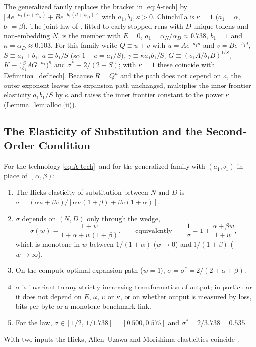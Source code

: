 \begin{definition}\label{def:kappa}
The generalized family replaces the bracket in \eqref{eq:A-tech} by
$\big[Ae^{-a_1(n+\psi_N)}+Be^{-b_1(d+\psi_D)}\big]^{\kappa}$ with $a_1,b_1,\kappa>0$. Chinchilla is $\kappa=1$
($a_1=\alpha$, $b_1=\beta$). The joint law of \citet[eq.~1.5]{kaplan2020scaling}, fitted to early-stopped runs with $D$ unique tokens and
non-embedding $N$, is the member with $E=0$, $a_1=\alpha_N/\alpha_D\approx0.738$, $b_1=1$ and $\kappa=\alpha_D\approx0.103$. For this family write $Q\equiv u+v$
with $u=Ae^{-a_1n}$ and $v=Be^{-b_1d}$, $S\equiv a_1+b_1$, $a\equiv b_1/S$ (so $1-a=a_1/S$), $\gamma\equiv\kappa a_1b_1/S$,
$G\equiv(a_1A/b_1B)^{1/S}$, $K\equiv\big(\tfrac{S}{b_1}AG^{-a_1}\big)^{\kappa}$ and $\sigma^*\equiv2/(2+S)$; with $\kappa=1$
these coincide with Definition~\ref{def:tech}. Because $R=Q^\kappa$ and the path does not depend on $\kappa$, the outer exponent leaves the expansion path
unchanged, multiplies the inner frontier elasticity $a_1b_1/S$ by $\kappa$ and raises the inner frontier constant to
the power $\kappa$ (Lemma~\ref{lem:alloc}(ii)).
\end{definition}

\subsection{The Elasticity of Substitution and the Second-Order Condition}\label{app:sigma}

\begin{lemma}\label{lem:sigma}
For the technology \eqref{eq:A-tech}, and for the generalized family with $(a_1,b_1)$ in place of $(\alpha,\beta)$:
\begin{enumerate}
\item[(i)] The Hicks elasticity of substitution between $N$ and $D$ is
$\sigma=(\alpha u+\beta v)/[\alpha u(1+\beta)+\beta v(1+\alpha)]$.
\item[(ii)] $\sigma$ depends on $(N,D)$ only through the wedge,
\[
\sigma(w)=\frac{1+w}{1+\alpha+w(1+\beta)},\qquad\text{equivalently}\qquad\frac1\sigma=1+\frac{\alpha+\beta w}{1+w},
\]
which is monotone in $w$ between $1/(1+\alpha)$ ($w\to0$) and $1/(1+\beta)$ ($w\to\infty$).
\item[(iii)] On the compute-optimal expansion path ($w=1$), $\sigma=\sigma^*=2/(2+\alpha+\beta)$.
\item[(iv)] $\sigma$ is invariant to any strictly increasing transformation of output; in particular it does not depend
on $E$, $\omega$, $\upsilon$ or $\kappa$, or on whether output is measured by loss, bits per byte or a monotone
benchmark link.
\item[(v)] For the \citet{kaplan2020scaling} law, $\sigma\in[1/2,\,1/1.738]=[0.500,0.575]$ and $\sigma^*=2/3.738=0.535$.
\end{enumerate}
With two inputs the Hicks, Allen--Uzawa and Morishima elasticities coincide \citep{blackorby1989real}.
\end{lemma}

